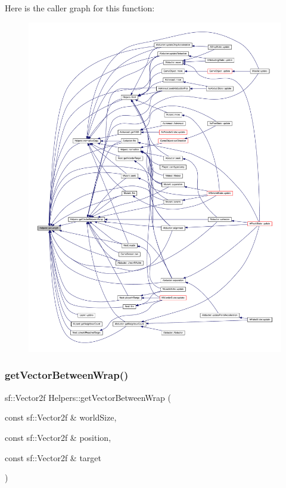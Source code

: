 Here is the caller graph for this function\+:
\nopagebreak
\begin{figure}[H]
\begin{center}
\leavevmode
\includegraphics[width=350pt]{namespace_helpers_aad7d5773a24a3413ca8eca68aa6a872b_icgraph}
\end{center}
\end{figure}
\mbox{\label{namespace_helpers_a93defc4f62a0b29303b84ea17eeeb2fb}} 
\subsubsection{\texorpdfstring{get\+Vector\+Between\+Wrap()}{getVectorBetweenWrap()}}
{\footnotesize\ttfamily sf\+::\+Vector2f Helpers\+::get\+Vector\+Between\+Wrap (\begin{DoxyParamCaption}\item[{const sf\+::\+Vector2f \&}]{world\+Size,  }\item[{const sf\+::\+Vector2f \&}]{position,  }\item[{const sf\+::\+Vector2f \&}]{target }\end{DoxyParamCaption})\hspace{0.3cm}{\ttfamily [inline]}}

